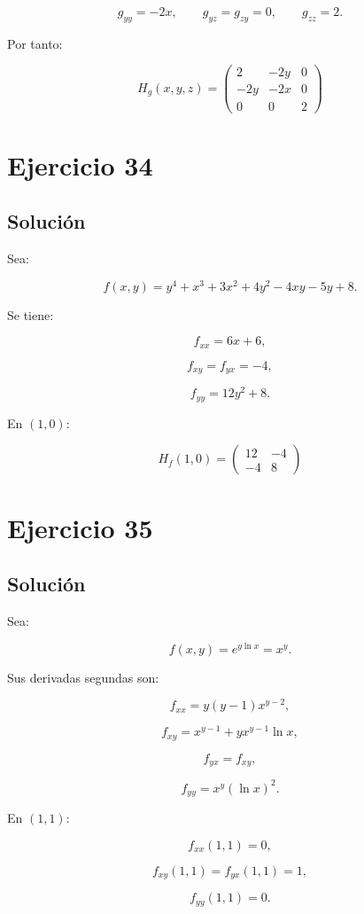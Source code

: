 \documentclass[11pt,a4paper]{article}
\begin{document}
\[
g_{yy}=-2x,
\qquad
g_{yz}=g_{zy}=0,
\qquad
g_{zz}=2.
\]

Por tanto:

\[
\boxed{
H_g(x,y,z)
=
\begin{pmatrix}
2&-2y&0\\
-2y&-2x&0\\
0&0&2
\end{pmatrix}
}
\]

\section{Ejercicio 34}
\subsection{Solución}

Sea:

\[
f(x,y)
=
y^4+x^3+3x^2+4y^2-4xy-5y+8.
\]

Se tiene:

\[
f_{xx}=6x+6,
\]

\[
f_{xy}=f_{yx}=-4,
\]

\[
f_{yy}=12y^2+8.
\]

En \((1,0)\):

\[
\boxed{
H_f(1,0)
=
\begin{pmatrix}
12&-4\\
-4&8
\end{pmatrix}
}
\]

\section{Ejercicio 35}
\subsection{Solución}

Sea:

\[
f(x,y)
=
e^{y\ln x}
=
x^y.
\]

Sus derivadas segundas son:

\[
f_{xx}
=
y(y-1)x^{y-2},
\]

\[
f_{xy}
=
x^{y-1}
+
yx^{y-1}\ln x,
\]

\[
f_{yx}=f_{xy},
\]

\[
f_{yy}
=
x^y(\ln x)^2.
\]

En \((1,1)\):

\[
f_{xx}(1,1)=0,
\]

\[
f_{xy}(1,1)=f_{yx}(1,1)=1,
\]

\[
f_{yy}(1,1)=0.
\]
\end{document}

